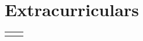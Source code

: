 \documentclass[10pt, a4paper]{article}
\newcommand{\rhs}[1]{\hfill{\small{\textsl{(#1)}}}}
\newcommand{\rhsmall}[1]{\hfill{\footnotesize{\textsl{(#1)}}}}
\begin{document}
\section{Extracurriculars}
\vspace{-0.5em}
\begin{tabular}{p{0.99in}p{6.01in}}
\vspace{-0.5em}

\end{tabular}
\end{document}
